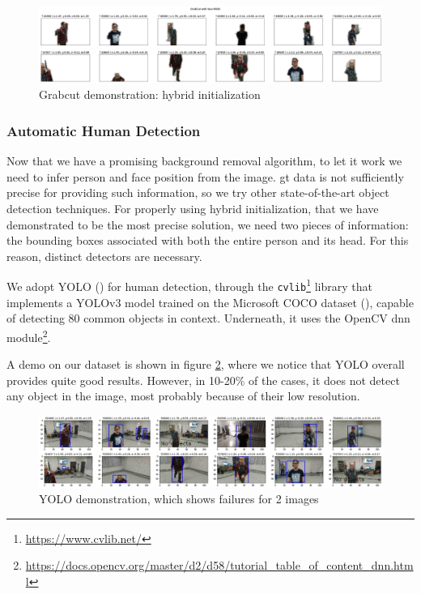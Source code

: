 \begin{figure}[!h]
	\centering
	\includegraphics[width=1\textwidth]{"contents/images/04-2grabcut-3hybrid-final"}
	\caption[Grabcut demonstration: hybrid initialization]{Grabcut demonstration: hybrid initialization}
	\label{fig:grabcut-hybrid-example}
\end{figure}


\subsubsection{Automatic Human Detection}
\label{subsec:masking-yolo}

Now that we have a promising background removal algorithm, to let it work we need to infer person and face position from the image. \gls{gt} data is not sufficiently precise for providing such information, so we try other state-of-the-art object detection techniques. For properly using hybrid initialization, that we have demonstrated to be the most precise solution, we need two pieces of information: the bounding boxes associated with both the entire person and its head. For this reason, distinct detectors are necessary.

\medskip

We adopt YOLO (\cite{redmon2016look}) for human detection, through the \texttt{cvlib}\footnote{\url{https://www.cvlib.net/}} library that implements a YOLOv3 model trained on the Microsoft COCO dataset (\cite{lin2015microsoft}), capable of detecting 80 common objects in context. Underneath, it uses the OpenCV dnn module\footnote{\url{https://docs.opencv.org/master/d2/d58/tutorial_table_of_content_dnn.html}}.

A demo on our dataset is shown in figure \ref{fig:yolo}, where we notice that YOLO overall provides quite good results. However, in 10-20\% of the cases, it does not detect any object in the image, most probably because of their low resolution.

\begin{figure}[!h]
	\centering
	\includegraphics[width=1\textwidth]{"contents/images/04-3yolo"}
	\caption[YOLO demonstration, which shows failures for 2 images]{YOLO demonstration, which shows failures for 2 images}
	\label{fig:yolo}
\end{figure}

